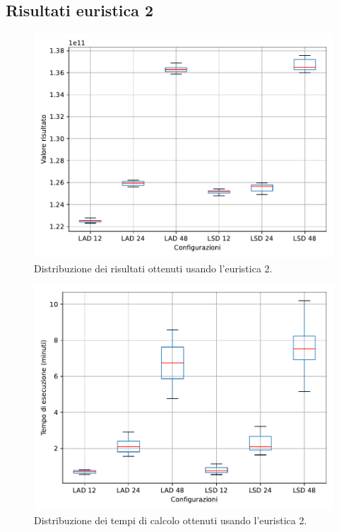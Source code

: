 %
%
\subsection{Risultati euristica 2}

\begin{figure}[H]
    \centering
    \includegraphics[scale=0.70]{img/grafico-e2-valore.pdf}
    \caption{Distribuzione dei risultati ottenuti usando l'euristica 2.}
    \label{graf:e2-valore-range}
\end{figure}

\begin{figure}[H]
    \centering
    \includegraphics[scale=0.70]{img/grafico-e2-tempo.pdf}
    \caption{Distribuzione dei tempi di calcolo ottenuti usando l'euristica 2.}
    \label{graf:e2-tempo-range}
\end{figure}

